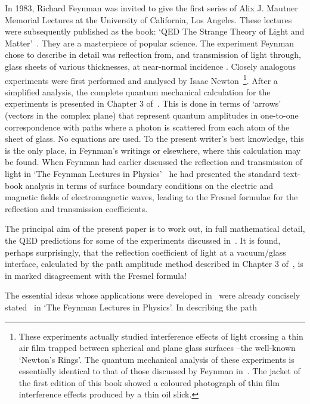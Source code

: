   In 1983, Richard Feynman was invited to give the first series of Alix J. Mautner Memorial
 Lectures at the University of California, Los Angeles. These lectures were subsequently
 published as the book: `QED The Strange Theory of Light and Matter'~\cite{Feyn1}. They are
 a masterpiece of popular science. The experiment Feynman chose to describe in detail was
  reflection from, and transmission of light through, glass sheets of various
 thicknesses, at near-normal incidence . Closely analogous experiments were first performed and analysed by
 Isaac Newton~\cite{Newton}\footnote{ These experiments actually studied interference
 effects of light crossing a thin air film trapped between spherical and plane 
 glass surfaces --the well-known `Newton's Rings'. The quantum mechanical analysis
 of these experiments is essentially identical to that of those discussed by Feynman in~\cite{Feyn1}.
 The jacket of the first edition of this book showed a coloured photograph of 
 thin film interference effects produced by a thin oil slick.}. After a simplified analysis,
 the complete quantum mechanical calculation for the experiments is presented in Chapter 3 
 of~\cite{Feyn1}. This is done in terms of `arrows' (vectors in the complex plane)
  that represent quantum amplitudes in one-to-one
 correspondence with paths where a photon is scattered from each atom of the sheet of glass.
 No equations are used. To the present writer's best knowledge, this is the only place, in
 Feynman's writings or elsewhere, where this calculation may be found. When Feynman had
 earlier discussed the reflection and transmission of light in `The Feynman Lectures in 
  Physics'~\cite{Feyn2} he had presented the standard text-book analysis in terms of surface
  boundary conditions on the electric and magnetic fields of electromagnetic waves, 
 leading to the Fresnel formulae 
 for the reflection and transmission coefficients. 
 \par The principal aim of the present paper is to work out, in full mathematical detail,
  the QED predictions for some of the experiments discussed in~\cite{Feyn1}. It is found, perhaps 
   surprisingly, that the reflection coefficient of light at a vacuum/glass interface, calculated
   by the path amplitude method described in Chapter 3 of~\cite{Feyn1}, is in marked disagreement
  with the Fresnel formula! 
  \par The essential ideas whose applications were developed in~\cite{Feyn1} were already
  concisely stated~\cite{Feyn3} in `The Feynman Lectures in Physics'. In describing the path

